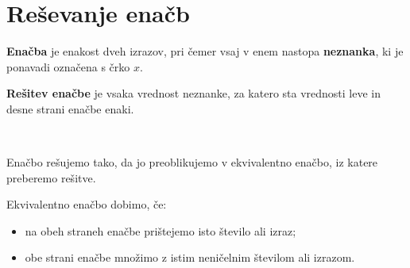 

    \newpage

    \section{Reševanje enačb}

        
                \textbf{Enačba} je enakost dveh izrazov, pri čemer vsaj v enem nastopa \textbf{neznanka}, ki je ponavadi označena s črko $x$.

                \textbf{Rešitev enačbe} je vsaka vrednost neznanke, za katero sta vrednosti leve in desne strani enačbe enaki.
            
~

                Enačbo rešujemo tako, da jo preoblikujemo v ekvivalentno enačbo, iz katere preberemo rešitve.

                Ekvivalentno enačbo dobimo, če:
                \begin{itemize}
                    \item na obeh straneh enačbe prištejemo isto število ali izraz;
                    \item obe strani enačbe množimo z istim neničelnim številom ali izrazom.
                \end{itemize}
            
        
                ~~\\
        
